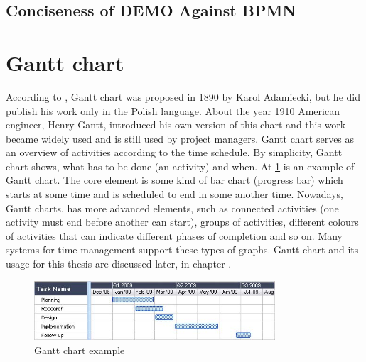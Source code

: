 \subsection{Conciseness of DEMO Against BPMN}

\section{Gantt chart}
According to \cite{gantt-chart-2018}, Gantt chart was proposed in 1890 by Karol Adamiecki, but he did publish his work only in the Polish language. About the year 1910 American engineer, Henry Gantt, introduced his own version of this chart and this work became widely used and is still used by project managers. 
Gantt chart serves as an overview of activities according to the time schedule. By simplicity, Gantt chart shows, what has to be done (an activity) and when.
At \cref{fig:gantt-chart-example} is an example of Gantt chart. The core element is some kind of bar chart (progress bar) which starts at some time and is scheduled to end in some another time.
Nowadays, Gantt charts, has more advanced elements, such as connected activities (one activity must end before another can start), groups of activities, different colours of activities that can indicate different phases of completion and so on. Many systems for time-management support these types of graphs.
Gantt chart and its usage for this thesis are discussed later, in chapter .

\begin{figure}[ht!]
	\centering
    \includegraphics[width=0.8\textwidth]{img/gantt-chart-example.jpg}
    \caption{Gantt chart example\cite{gantt-chart-2018}}
    \label{fig:gantt-chart-example}
\end{figure}

